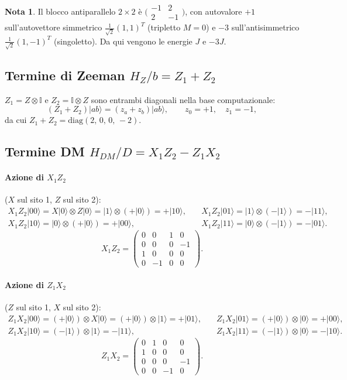 \documentclass[11pt,a4paper]{article}
\newcommand{\ket}[1]{\lvert #1 \rangle}
\theoremstyle{definition}
\newtheorem*{nota}{Nota}
\begin{document}
\begin{nota}
Il blocco antiparallelo $2\times2$ è $\bigl(\begin{smallmatrix}-1&2\\2&-1\end{smallmatrix}\bigr)$,
con autovalore $+1$ sull'autovettore simmetrico $\tfrac{1}{\sqrt2}(1,1)^T$ (tripletto $M=0$) e $-3$
sull'antisimmetrico $\tfrac{1}{\sqrt2}(1,-1)^T$ (singoletto). Da qui vengono le energie $J$ e $-3J$.
\end{nota}

\subsection{Termine di Zeeman $H_Z/b = Z_1+Z_2$}

$Z_1=Z\otimes\mathbb{I}$ e $Z_2=\mathbb{I}\otimes Z$ sono entrambi diagonali nella base computazionale:
\[
(Z_1+Z_2)\ket{ab}=(z_a+z_b)\ket{ab},\qquad z_0=+1,\quad z_1=-1,
\]
da cui $Z_1+Z_2=\mathrm{diag}(2,\,0,\,0,\,-2)$.

\subsection{Termine DM $H_{DM}/D = X_1Z_2 - Z_1X_2$}

\paragraph{Azione di $X_1Z_2$} ($X$ sul sito 1, $Z$ sul sito 2):
\begin{align*}
X_1Z_2\ket{00}=X\ket{0}\otimes Z\ket{0}=\ket{1}\otimes(+\ket{0})=+\ket{10},&\quad
X_1Z_2\ket{01}=\ket{1}\otimes(-\ket{1})=-\ket{11},\\
X_1Z_2\ket{10}=\ket{0}\otimes(+\ket{0})=+\ket{00},&\quad
X_1Z_2\ket{11}=\ket{0}\otimes(-\ket{1})=-\ket{01}.
\end{align*}
\[
X_1Z_2=\begin{pmatrix}0&0&1&0\\0&0&0&-1\\1&0&0&0\\0&-1&0&0\end{pmatrix}.
\]

\paragraph{Azione di $Z_1X_2$} ($Z$ sul sito 1, $X$ sul sito 2):
\begin{align*}
Z_1X_2\ket{00}=(+\ket{0})\otimes X\ket{0}=(+\ket{0})\otimes\ket{1}=+\ket{01},&\quad
Z_1X_2\ket{01}=(+\ket{0})\otimes\ket{0}=+\ket{00},\\
Z_1X_2\ket{10}=(-\ket{1})\otimes\ket{1}=-\ket{11},&\quad
Z_1X_2\ket{11}=(-\ket{1})\otimes\ket{0}=-\ket{10}.
\end{align*}
\[
Z_1X_2=\begin{pmatrix}0&1&0&0\\1&0&0&0\\0&0&0&-1\\0&0&-1&0\end{pmatrix}.
\]
\end{document}
